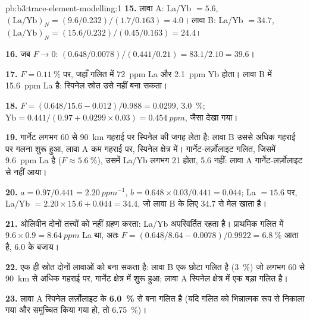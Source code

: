 \begin{solution}{pb:b3:trace-element-modelling:1}
\textbf{15.} लावा A: La/Yb $= 5.6$, $(\mathrm{La}/\mathrm{Yb})_N =
(9.6/0.232)/(1.7/0.163) = 4.0$। लावा B: La/Yb $= 34.7$, $(\mathrm{La}/\mathrm{Yb})_N
= (15.6/0.232)/(0.45/0.163) = 24.4$।

\textbf{16.} जब $F \to 0$: $(0.648/0.0078)/(0.441/0.21) = 83.1/2.10 = 39.6$।

\textbf{17.} $F = \qty{0.11}{\percent}$ पर, जहाँ गलित में
\qty{72}{ppm} La और \qty{2.1}{ppm} Yb होता। लावा B में \qty{15.6}{ppm} La है:
स्पिनेल स्रोत उसे नहीं बना सकता।

\textbf{18.} $F = (0.648/15.6 - 0.012)/0.988 = 0.0299$, \qty{3.0}{\percent};
$\mathrm{Yb} = 0.441/(0.97 + 0.0299\times0.03) = \qty{0.454}{ppm}$, जैसा
देखा गया।

\textbf{19.} गार्नेट लगभग 60 से \qty{90}{km} गहराई पर स्पिनेल की जगह लेता है: लावा B
उससे अधिक गहराई पर गलना शुरू हुआ, लावा A कम गहराई पर, स्पिनेल क्षेत्र में। गार्नेट-लर्ज़ोलाइट
गलित, जिसमें \qty{9.6}{ppm} La है ($F \approx \qty{5.6}{\percent}$), उसमें La/Yb लगभग 21 होता, 5.6 नहीं:
लावा A गार्नेट-लर्ज़ोलाइट से नहीं आया।

\textbf{20.} $a = 0.97/0.441 = \qty{2.20}{ppm^{-1}}$, $b = 0.648\times0.03/0.441
= 0.044$; La $= 15.6$ पर, La/Yb $= 2.20\times15.6 + 0.044 = 34.4$, जो
लावा B के लिए 34.7 से मेल खाता है।

\textbf{21.} ओलिवीन दोनों तत्त्वों को नहीं ग्रहण करता: La/Yb अपरिवर्तित रहता है। प्राथमिक
गलित में $9.6\times0.9 = \qty{8.64}{ppm}$ La था, अतः $F = (0.648/8.64 -
0.0078)/0.9922 = \qty{6.8}{\percent}$ आता है, 6.0 के बजाय।

\textbf{22.} एक ही स्रोत दोनों लावाओं को बना सकता है: लावा B एक छोटा गलित है
(\qty{3}{\percent}) जो लगभग 60 से
\qty{90}{km} से अधिक गहराई पर, गार्नेट क्षेत्र में शुरू हुआ; लावा A स्पिनेल क्षेत्र में एक बड़ा गलित है।

\textbf{23.} लावा A स्पिनेल लर्ज़ोलाइट के \textbf{\qty[text-series-to-math=true]{6.0}{\percent}}
 से बना गलित है (यदि गलित को भिन्नात्मक रूप से निकाला गया
और समुच्चित किया गया हो, तो \qty{6.75}{\percent})।
\end{solution}
